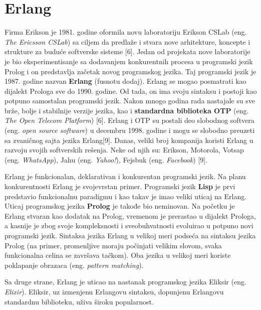 \documentclass[12pt,oneside]{memoir}
\begin{document}
\section{Erlang}
Firma Erikson je 1981. godine oformila novu laboratoriju Erikson CSLab (eng. \textit{The Ericsson CSLab}) sa ciljem da predlaže i stvara nove arhitekture, koncepte i strukture za buduće softverske sisteme [6]. Jedan od projekata nove laboratorije  je bio eksperimentisanje sa dodavanjem konkurentnih procesa u programski jezik Prolog i on predstavlja začetak novog programskog jezika. Taj programski jezik je 1987. godine nazvan \textbf{Erlang} (fusnotu dodaj). Erlang se mogao posmatrati kao dijalekt Prologa sve do 1990. godine. Od tada, on ima svoju sintaksu i postoji kao potpuno samostalan programski
jezik. Nakon mnogo godina rada nastajale su sve brže, bolje i stabilnije verzije jezika, kao i \textbf{standardna biblioteka OTP} (eng. \textit{The Open Telecom Platform}) [6]. Erlang i OTP su postali deo slobodnog softvera (eng. \textit{open source software}) u decembru 1998. godine i mogu se slobodno preuzeti sa zvaničnog sajta jezika Erlang[9]. Danas, veliki broj kompanija koristi Erlang u razvoju svojih softverskih rešenja. Neke od
njih su: Erikson, Motorola, Votsap (eng. \textit{WhatsApp}), Jahu (eng. \textit{Yahoo!}),
Fejsbuk (eng. \textit{Facebook}) [9].

Erlang je funkcionalan, deklarativan i konkurentan programski jezik. Na planu konkurentnosti Erlang je
svojevrstan primer. Programski jezik \textbf{Lisp} je prvi predstavio funkcionalnu paradigmu i kao takav je imao veliki uticaj na Erlang. Uticaj programskog jezika \textbf{Prolog} je takođe bio neminovan. Na početku je Erlang stvaran kao dodatak na Prolog, vremenom je prerastao
u dijalekt Prologa, a kasnije je zbog svoje kompleksnosti i sveobuhvatnosti evoluirao u potpuno novi programski jezik. Sintaksa jezika Erlang u velikoj meri podseća na sintaksu jezika Prolog (na primer, promenljive moraju počinjati velikim slovom, svaka funkcionalna celina se završava tačkom). Oba jezika u velikoj meri koriste poklapanje obrazaca (eng. \textit{pattern matching}).

Sa druge strane, Erlang je uticao na nastanak programskog jezika Eliksir (eng. \textit{Elixir}). Eliksir, uz izmenjenu Erlangovu sintaksu, dopunjenu Erlangovu
standardnu biblioteku, uživa široku popularnost.
     
\end{document}
